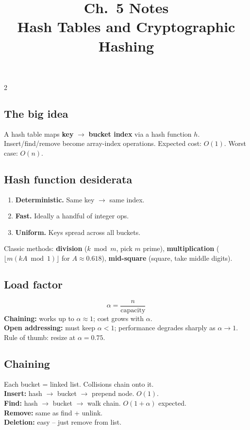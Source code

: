 \documentclass[10pt]{article}
\title{Ch.~5 Notes\\\large Hash Tables and Cryptographic Hashing}
\author{}
\date{}
\begin{document}
\maketitle
\vspace{-2em}

\begin{multicols}{2}

\subsection*{The big idea}
A hash table maps \textbf{key} $\to$ \textbf{bucket index} via a hash
function $h$. Insert/find/remove become array-index operations. Expected
cost: $O(1)$. Worst case: $O(n)$.

\subsection*{Hash function desiderata}
\begin{enumerate}
    \item \textbf{Deterministic.} Same key $\to$ same index.
    \item \textbf{Fast.} Ideally a handful of integer ops.
    \item \textbf{Uniform.} Keys spread across all buckets.
\end{enumerate}
Classic methods: \textbf{division} ($k \bmod m$, pick $m$ prime),
\textbf{multiplication} ($\lfloor m (k A \bmod 1) \rfloor$ for
$A \approx 0.618$), \textbf{mid-square} (square, take middle digits).

\subsection*{Load factor}
\[
\alpha = \frac{n}{\text{capacity}}
\]
\textbf{Chaining:} works up to $\alpha \approx 1$; cost grows with $\alpha$.\\
\textbf{Open addressing:} must keep $\alpha < 1$; performance degrades
sharply as $\alpha \to 1$. Rule of thumb: resize at $\alpha = 0.75$.

\subsection*{Chaining}
Each bucket = linked list. Collisions chain onto it.\\
\textbf{Insert:} hash $\to$ bucket $\to$ prepend node. $O(1)$.\\
\textbf{Find:} hash $\to$ bucket $\to$ walk chain. $O(1 + \alpha)$
expected.\\
\textbf{Remove:} same as find + unlink.\\
\textbf{Deletion:} easy -- just remove from list.


\end{multicols}
\end{document}
